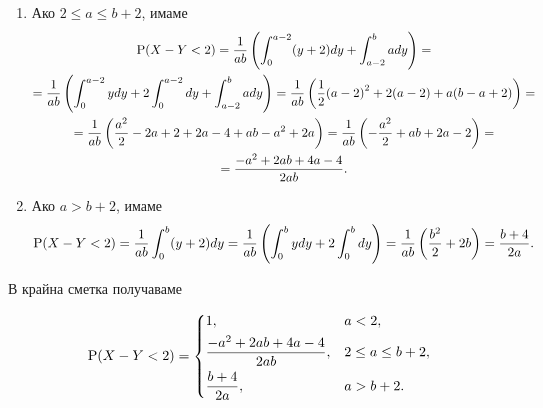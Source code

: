 \documentclass[numbers=endperiod, DIV=15, bibliography=totocnumbered]{scrartcl}
\begin{document}
\begin{solution}
\begin{enumerate}[label=\alph*)]
\begin{enumerate}[label=\arabic*)]
      \item Ако $2 \leq a \leq b + 2$, имаме
      \begin{multline*}
        \operatorname{P}(X - Y < 2)
        =
        \frac 1 {ab} \left(\int_0^{a-2} (y+2) dy + \int_{a-2}^b a dy \right)
        = \\ =
        \frac 1 {ab} \left(\int_0^{a-2} y dy + 2 \int_0^{a-2} dy + \int_{a-2}^b a dy \right)
        =
        \frac 1 {ab} \left(\frac 1 2 {(a-2)}^2 + 2(a-2) + a(b-a+2) \right)
        = \\ =
        \frac 1 {ab} \left(\frac {a^2} 2 - 2a + 2 + 2a - 4 + ab - a^2 + 2a \right)
        =
        \frac 1 {ab} \left(-\frac {a^2} 2 + ab + 2a - 2 \right)
        = \\ =
        \frac {-a^2 + 2ab + 4a - 4} {2ab}.
      \end{multline*}

      \item Ако $a > b + 2$, имаме
      \begin{displaymath}
        \operatorname{P}(X - Y < 2)
        =
        \frac 1 {ab} \int_0^b (y+2) dy
        =
        \frac 1 {ab} \left( \int_0^b y dy + 2 \int_0^b dy \right)
        =
        \frac 1 {ab} \left(\frac {b^2} 2 + 2b \right)
        =
        \frac {b + 4} {2a}.
      \end{displaymath}
    \end{enumerate}

    В крайна сметка получаваме

    \begin{displaymath}
      \operatorname{P}(X - Y < 2) = \begin{dcases}
        1, &a < 2, \\
        \frac {-a^2 + 2ab + 4a - 4} {2ab}, &2 \leq a \leq b + 2, \\
        \frac {b + 4} {2a}, &a > b + 2.
      \end{dcases}
    \end{displaymath}
  \end{enumerate}
\end{solution}

\printbibliography
\end{document}
